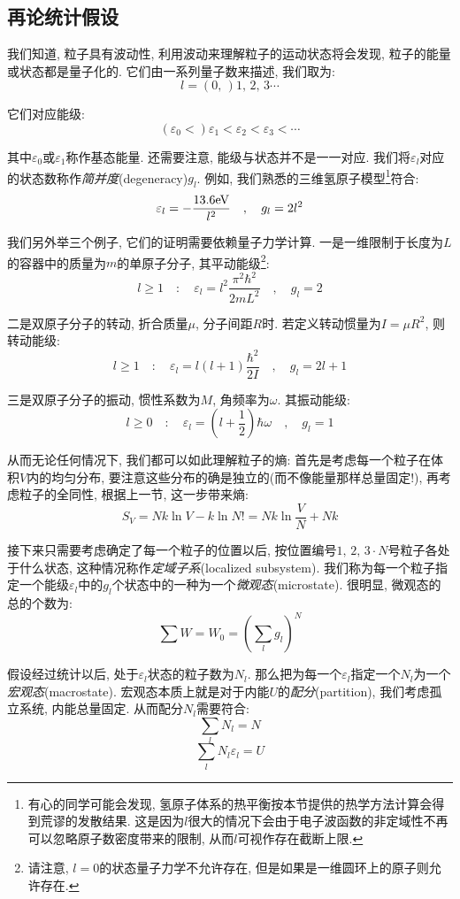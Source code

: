 \subsection{再论统计假设}

我们知道, 粒子具有波动性, 利用波动来理解粒子的运动状态将会发现, 粒子的能量或状态都是量子化的. 它们由一系列量子数来描述, 我们取为:
\[l=(0,\,)1,\,2,\,3\cdots\]

它们对应能级:
\[(\varepsilon_0<)\varepsilon_1<\varepsilon_2<\varepsilon_3<\cdots\]

其中$\varepsilon_0$或$\varepsilon_1$称作基态能量. 还需要注意, 能级与状态并不是一一对应. 我们将$\varepsilon_l$对应的状态数称作\emph{简并度}(degeneracy)$g_l$. 例如, 我们熟悉的三维氢原子模型\footnote{有心的同学可能会发现, 氢原子体系的热平衡按本节提供的热学方法计算会得到荒谬的发散结果. 这是因为$l$很大的情况下会由于电子波函数的非定域性不再可以忽略原子数密度带来的限制, 从而$l$可视作存在截断上限.}符合:
\[\varepsilon_l=-\frac{13.6{\rm eV}}{l^2} \quad,\quad g_l=2l^2\]

我们另外举三个例子, 它们的证明需要依赖量子力学计算. 一是一维限制于长度为$L$的容器中的质量为$m$的单原子分子, 其平动能级\footnote{请注意, $l=0$的状态量子力学不允许存在, 但是如果是一维圆环上的原子则允许存在.}:
\[l\geq 1 \quad:\quad \varepsilon_l=l^2\frac{\pi^2\hbar^2}{2mL^2} \quad,\quad g_l=2\]

二是双原子分子的转动, 折合质量$\mu$, 分子间距$R$时. 若定义转动惯量为$I=\mu R^2$, 则转动能级:
\[l\geq 1 \quad:\quad \varepsilon_l=l(l+1)\frac{\hbar^2}{2I} \quad,\quad g_l=2l+1\]

三是双原子分子的振动, 惯性系数为$M$, 角频率为$\omega$. 其振动能级:
\[l\geq 0 \quad:\quad \varepsilon_l=\left(l+\frac{1}{2}\right)\hbar \omega \quad,\quad g_l=1\]

从而无论任何情况下, 我们都可以如此理解粒子的熵: 首先是考虑每一个粒子在体积$V$内的均匀分布, 要注意这些分布的确是独立的(而不像能量那样总量固定!), 再考虑粒子的全同性, 根据上一节, 这一步带来熵:
\[S_V=Nk\ln V-k\ln N!=Nk\ln\frac{V}{N}+Nk\]

接下来只需要考虑确定了每一个粒子的位置以后, 按位置编号$1,\,2,\,3\cdot N$号粒子各处于什么状态, 这种情况称作\emph{定域子系}(localized subsystem). 我们称为每一个粒子指定一个能级$\varepsilon_l$中的$g_l$个状态中的一种为一个\emph{微观态}(microstate). 很明显, 微观态的总的个数为:
\[\sum W=W_0=\left(\sum_l g_l\right)^N\]

假设经过统计以后, 处于$\varepsilon_l$状态的粒子数为$N_l$. 那么把为每一个$\varepsilon_l$指定一个$N_l$为一个\emph{宏观态}(macrostate). 宏观态本质上就是对于内能$U$的\emph{配分}(partition), 我们考虑孤立系统, 内能总量固定. 从而配分$N_l$需要符合:
\[\sum_l N_l=N\]
\[\sum_l N_l\varepsilon_l=U\]

